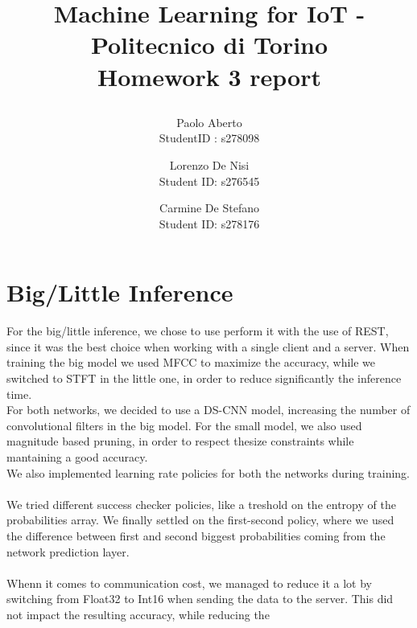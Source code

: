 \documentclass{article}
\date{}
\begin{document}
\author{Paolo Aberto\\
StudentID : s278098\\

\and
Lorenzo De Nisi\\
Student ID: s276545\\

\and
Carmine De Stefano\\
Student ID: s278176\\
}

\justifying

\title{
    \vspace{0.8cm}
    
    Machine Learning for IoT - 
    Politecnico di Torino\\
    \vspace{.5cm}
    \Large \textbf{Homework 3 report}
    \vspace{.1cm}
}

\maketitle
\thispagestyle{empty} 
\vspace{-0.9cm}


\section{Big/Little Inference}
For the big/little inference, we chose to use perform it with the use of REST, since it was the best choice when working with a single client and a server.
When training the big model we used MFCC to maximize the accuracy, while we switched to STFT in the little one, in order to reduce significantly the inference time.
\\
For both networks, we decided to use a DS-CNN model, increasing the number of convolutional filters in the big model. For the small model, we also used magnitude based pruning, in order to respect thesize constraints while mantaining a good accuracy.\\
We also implemented learning rate policies for both the networks during training.\\\\
We tried different success checker policies, like a treshold on the entropy of the probabilities array. We finally settled on the first-second policy, where we used the difference between first and second biggest probabilities coming from the network prediction layer.
\\\\
Whenn it comes to communication cost, we managed to reduce it a lot by switching from Float32 to Int16 when sending the data to the server. This did not impact the resulting accuracy, while reducing the 
\end{document}
